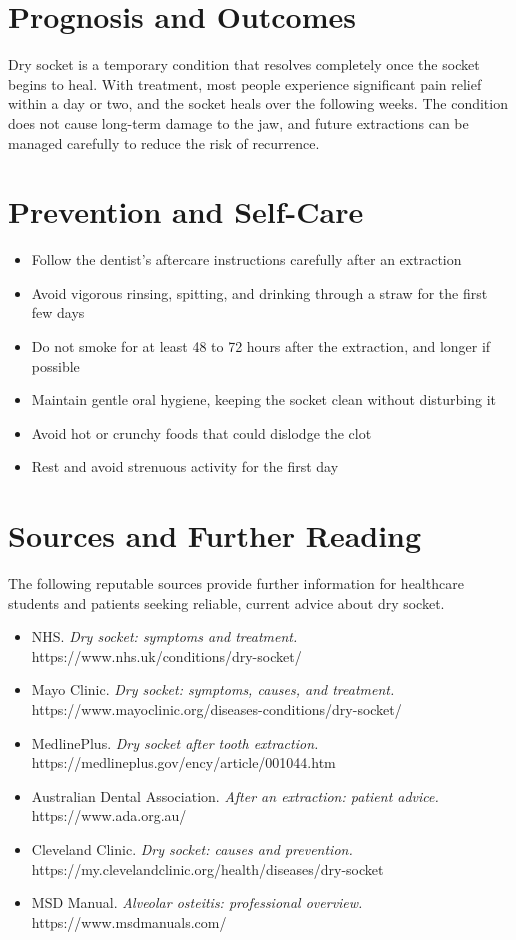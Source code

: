 \section*{Prognosis and Outcomes}
Dry socket is a temporary condition that resolves completely once the socket begins to heal. With treatment, most people experience significant pain relief within a day or two, and the socket heals over the following weeks. The condition does not cause long-term damage to the jaw, and future extractions can be managed carefully to reduce the risk of recurrence.

\section*{Prevention and Self-Care}
\begin{itemize}
    \item Follow the dentist's aftercare instructions carefully after an extraction
    \item Avoid vigorous rinsing, spitting, and drinking through a straw for the first few days
    \item Do not smoke for at least 48 to 72 hours after the extraction, and longer if possible
    \item Maintain gentle oral hygiene, keeping the socket clean without disturbing it
    \item Avoid hot or crunchy foods that could dislodge the clot
    \item Rest and avoid strenuous activity for the first day
\end{itemize}

\section*{Sources and Further Reading}
The following reputable sources provide further information for healthcare students and patients seeking reliable, current advice about dry socket.
\begin{itemize}
    \item NHS. \textit{Dry socket: symptoms and treatment.} https://www.nhs.uk/conditions/dry-socket/
    \item Mayo Clinic. \textit{Dry socket: symptoms, causes, and treatment.} https://www.mayoclinic.org/diseases-conditions/dry-socket/
    \item MedlinePlus. \textit{Dry socket after tooth extraction.} https://medlineplus.gov/ency/article/001044.htm
    \item Australian Dental Association. \textit{After an extraction: patient advice.} https://www.ada.org.au/
    \item Cleveland Clinic. \textit{Dry socket: causes and prevention.} https://my.clevelandclinic.org/health/diseases/dry-socket
    \item MSD Manual. \textit{Alveolar osteitis: professional overview.} https://www.msdmanuals.com/
\end{itemize}
